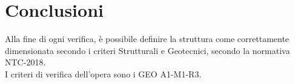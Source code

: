 \section{Conclusioni}
Alla fine di ogni verifica, è possibile definire la struttura come correttamente dimensionata secondo i criteri Strutturali e Geotecnici, secondo la normativa NTC-2018.\\
I criteri di verifica dell'opera sono i GEO A1-M1-R3.